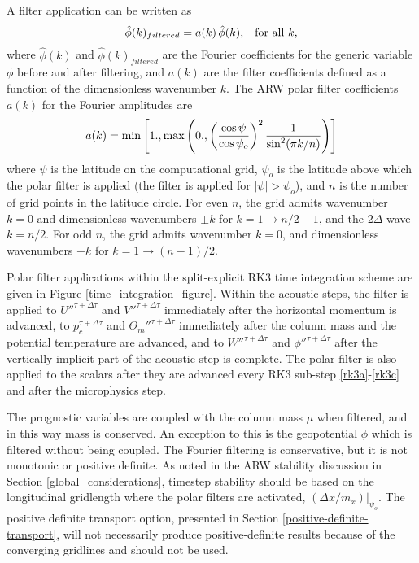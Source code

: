 A filter application can be written as
%
\begin{equation}
\hat\phi(k)_{filtered} = a(k)\,\hat\phi(k), \,\,\,\,\, \hbox{for all }k,
\notag
\end{equation}
%
where $\hat\phi(k)$ and $\hat\phi(k)_{filtered}$ are the Fourier
coefficients for the generic variable $\phi$ before and after filtering,
and $a(k)$ are the filter coefficients defined as a function of the
dimensionless wavenumber $k$.  The ARW polar filter coefficients $a(k)$ 
for the Fourier amplitudes are
%
\begin{equation}
a(k) = \hbox{min}\left[1.,\hbox{max}\left(0.,
\left({\cos{\psi} \over \cos{\psi_o}}\right)^2  {1 \over \sin^2({\pi k/n)}}
\right)\right]
\notag
\end{equation}
%
where $\psi$ is the latitude on the computational grid, $\psi_o$ is the
latitude above which the polar filter is applied (the filter is applied
for $ |\psi| > \psi_o$), and $n$ is the number of grid points in the latitude
circle.  For even $n$, the grid
admits wavenumber $k=0$ and dimensionless wavenumbers $\pm k$ for
$k=1\to n/2 - 1$, and the $2\Delta$ wave $k=n/2$.  For odd $n$, the grid
admits wavenumber $k=0$, and dimensionless wavenumbers $\pm k$ for
$k=1\to (n-1)/2 $. 

Polar filter applications within the split-explicit RK3 time integration
scheme are given in Figure \ref{time_integration_figure}.
Within the acoustic steps,
the filter is applied to
${U''}^{\tau+\Delta\tau}$ and ${V''}^{\tau+\Delta\tau}$ immediately
after the horizontal momentum is advanced, to $p_c^{\tau+\Delta\tau}$
and ${\Theta_m''}^{\tau+\Delta\tau}$ immediately after the column mass and
the potential temperature are advanced, and to ${W''}^{\tau+\Delta\tau}$
and ${\phi''}^{\tau+\Delta\tau}$ after the vertically implicit part of
the acoustic step is complete.  The polar filter is also applied to the
scalars after they are advanced every RK3 sub-step
\eqref{rk3a}-\eqref{rk3c} and after the microphysics step.

The prognostic variables are coupled with the column mass $\mu$ when
filtered, and in this way mass is conserved.  An exception to this is
the geopotential $\phi$ which is filtered without being coupled.  The
Fourier filtering is conservative, but it is not monotonic or positive
definite.  As noted in the ARW stability discussion in Section
\ref{global_considerations}, timestep stability should be based on the longitudinal
gridlength where the polar filters are activated, $(\Delta
x/m_x)|_{\psi_o}$.  The positive definite transport option, presented in
Section \ref{positive-definite-transport}, will not necessarily produce
positive-definite results because of the converging gridlines and should
not be used.

